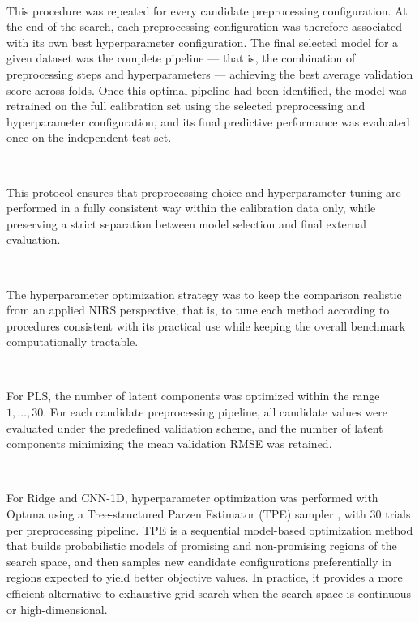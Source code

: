 \documentclass{article}
\begin{document}
~

This procedure was repeated for every candidate preprocessing configuration. At the end of the search, each preprocessing configuration was therefore associated with its own best hyperparameter configuration. The final selected model for a given dataset was the complete pipeline --- that is, the combination of preprocessing steps and hyperparameters --- achieving the best average validation score across folds. Once this optimal pipeline had been identified, the model was retrained on the full calibration set using the selected preprocessing and hyperparameter configuration, and its final predictive performance was evaluated once on the independent test set.

~

This protocol ensures that preprocessing choice and hyperparameter tuning are performed in a fully consistent way within the calibration data only, while preserving a strict separation between model selection and final external evaluation.

~

The hyperparameter optimization strategy was to keep the comparison realistic from an applied NIRS perspective, that is, to tune each method according to procedures consistent with its practical use while keeping the overall benchmark computationally tractable.

~

For PLS, the number of latent components was optimized within the range ${1,\dots,30}$. For each candidate preprocessing pipeline, all candidate values were evaluated under the predefined validation scheme, and the number of latent components minimizing the mean validation RMSE was retained.

~

For Ridge and CNN-1D, hyperparameter optimization was performed with Optuna \cite{akiba_2019_optuna} using a Tree-structured Parzen Estimator (TPE) sampler \cite{bergstra_2011_tpe}, with 30 trials per preprocessing pipeline. TPE is a sequential model-based optimization method that builds probabilistic models of promising and non-promising regions of the search space, and then samples new candidate configurations preferentially in regions expected to yield better objective values. In practice, it provides a more efficient alternative to exhaustive grid search when the search space is continuous or high-dimensional.
\end{document}
